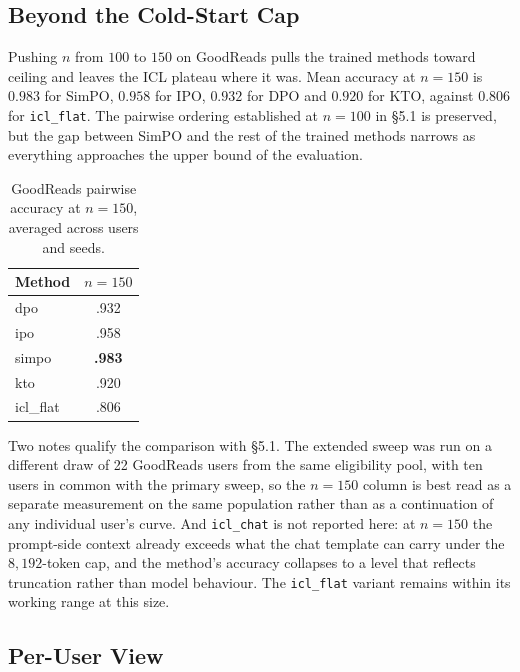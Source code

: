 \FloatBarrier

\subsection{Beyond the Cold-Start Cap}

Pushing $n$ from $100$ to $150$ on GoodReads pulls the trained methods toward ceiling and leaves the ICL plateau where it was. Mean accuracy at $n = 150$ is $0.983$ for SimPO, $0.958$ for IPO, $0.932$ for DPO and $0.920$ for KTO, against $0.806$ for \texttt{icl\_flat}. The pairwise ordering established at $n = 100$ in §5.1 is preserved, but the gap between SimPO and the rest of the trained methods narrows as everything approaches the upper bound of the evaluation.

\begin{table}[!ht]
\centering
\caption{GoodReads pairwise accuracy at $n = 150$, averaged across users and seeds.}
\label{tab:extended_acc}
\begin{tabular}{lc}
\toprule
\textbf{Method} & $n = 150$ \\
\midrule
dpo                 & .932 \\
ipo                 & .958 \\
simpo               & \textbf{.983} \\
kto                 & .920 \\
icl\_flat           & .806 \\
\bottomrule
\end{tabular}
\end{table}

Two notes qualify the comparison with §5.1. The extended sweep was run on a different draw of 22 GoodReads users from the same eligibility pool, with ten users in common with the primary sweep, so the $n = 150$ column is best read as a separate measurement on the same population rather than as a continuation of any individual user's curve. And \texttt{icl\_chat} is not reported here: at $n = 150$ the prompt-side context already exceeds what the chat template can carry under the $8{,}192$-token cap, and the method's accuracy collapses to a level that reflects truncation rather than model behaviour. The \texttt{icl\_flat} variant remains within its working range at this size.

\FloatBarrier

\subsection{Per-User View}

